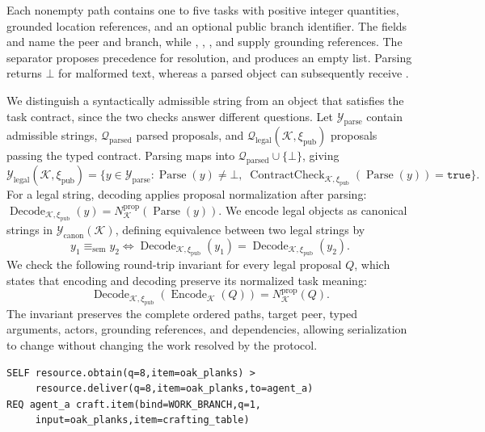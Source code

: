 \documentclass[sigconf,nonacm,balance=false]{aamas}
\begin{document}
Each nonempty path contains one to five tasks with positive integer quantities, grounded location references, and an optional public branch identifier. The fields  and  name the peer and branch, while , , , and  supply grounding references. The separator \artifact{>} proposes precedence for resolution, and  produces an empty  list. Parsing returns $\bot$ for malformed text, whereas a parsed object can subsequently receive .

We distinguish a syntactically admissible string from an object that satisfies the task contract, since the two checks answer different questions. Let $\mathcal Y_{\mathrm{parse}}$ contain admissible strings, $\mathcal Q_{\mathrm{parsed}}$ parsed proposals, and $\mathcal Q_{\mathrm{legal}}(\mathcal K,\xi_{\mathrm{pub}})$ proposals passing the typed contract. Parsing maps into $\mathcal Q_{\mathrm{parsed}}\cup\{\bot\}$, giving
\[
\mathcal Y_{\mathrm{legal}}(\mathcal K,\xi_{\mathrm{pub}})
=\{y\in\mathcal Y_{\mathrm{parse}}:\operatorname{Parse}(y)\neq\bot,\;
\operatorname{ContractCheck}_{\mathcal K,\xi_{\mathrm{pub}}}(\operatorname{Parse}(y))=\mathtt{true}\}.
\]
For a legal string, decoding applies proposal normalization after parsing: $\operatorname{Decode}_{\mathcal K,\xi_{\mathrm{pub}}}(y)=N_{\mathcal K}^{\mathrm{prop}}(\operatorname{Parse}(y))$. We encode legal objects as canonical strings in $\mathcal Y_{\mathrm{canon}}(\mathcal K)$, defining equivalence between two legal strings by
\begin{equation}
y_1\equiv_{\mathrm{sem}}y_2
\iff
\operatorname{Decode}_{\mathcal K,\xi_{\mathrm{pub}}}(y_1)
=
\operatorname{Decode}_{\mathcal K,\xi_{\mathrm{pub}}}(y_2).
\end{equation}
We check the following round-trip invariant for every legal proposal $Q$, which states that encoding and decoding preserve its normalized task meaning:
\begin{equation}
\operatorname{Decode}_{\mathcal K,\xi_{\mathrm{pub}}}(\operatorname{Encode}_{\mathcal K}(Q))
=
N_{\mathcal K}^{\mathrm{prop}}(Q).
\end{equation}
The invariant preserves the complete ordered paths, target peer, typed arguments, actors, grounding references, and dependencies, allowing serialization to change without changing the work resolved by the protocol.

\begin{lstlisting}[style=gcpdsl]
SELF resource.obtain(q=8,item=oak_planks) >
     resource.deliver(q=8,item=oak_planks,to=agent_a)
REQ agent_a craft.item(bind=WORK_BRANCH,q=1,
     input=oak_planks,item=crafting_table)
\end{lstlisting}
\end{document}
